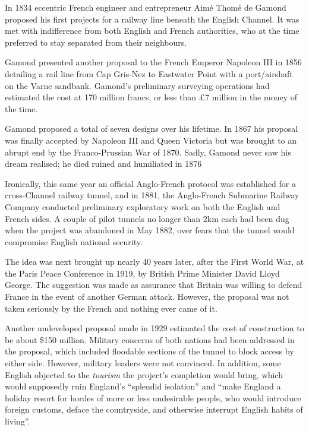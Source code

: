\documentclass[12pt]{article} %
\begin{document}
In 1834 eccentric French engineer and entrepreneur Aimé Thomé de Gamond proposed his first projects for a railway line beneath the English Channel. It was met with indifference from both English and French authorities, who at the time preferred to stay separated from their neighbours.

Gamond presented another proposal to the French Emperor Napoleon III in 1856 detailing a rail line from Cap Gris-Nez to Eastwater Point with a port\slash airshaft on the Varne sandbank. Gamond's preliminary surveying operations had estimated the cost at 170 million francs, or less than £7 million in the money of the time.\cite{ny-gamond}

Gamond proposed a total of seven designs over his lifetime. In 1867 his proposal was finally accepted by Napoleon III and Queen Victoria but was brought to an abrupt end by the Franco-Prussian War of 1870. Sadly, Gamond never saw his dream realised; he died ruined and humiliated in 1876\cite{gamond}

Ironically, this same year an official Anglo-French protocol was established for a cross-Channel railway tunnel\cite{bris}, and in 1881, the Anglo-French Submarine Railway Company conducted preliminary exploratory work on both the English and French sides. A couple of pilot tunnels no longer than 2km each had been dug when the project was abandoned in May 1882, over fears that the tunnel would compromise English national security.

The idea was next brought up nearly 40 years later, after the First World War, at the Paris Peace Conference in 1919, by British Prime Minister David Lloyd George. The suggestion was made as assurance that Britain was willing to defend France in the event of another German attack. However, the proposal was not taken seriously by the French and nothing ever came of it.

Another undeveloped proposal made in 1929 estimated the cost of construction to be about \$150 million. Military concerns of both nations had been addressed in the proposal, which included floodable sections of the tunnel to block access by either side. However, military leaders were not convinced. In addition, some English objected to the \emph{tourism} the project's completion would bring, which would supposedly ruin England's ``splendid isolation'' and ``make England a holiday resort for hordes of more or less undesirable people, who would introduce foreign customs, deface the countryside, and otherwise interrupt English habits of living''.\cite{pop29}
\end{document}
